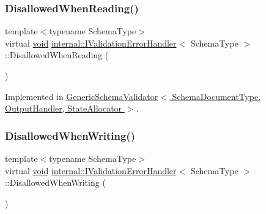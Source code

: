 \mbox{\label{classinternal_1_1IValidationErrorHandler_ac53a7125383d8051f4522ea222c3c5d5}} 
\subsubsection{\texorpdfstring{Disallowed\+When\+Reading()}{DisallowedWhenReading()}}
{\footnotesize\ttfamily template$<$typename Schema\+Type$>$ \\
virtual \hyperlink{imgui__impl__opengl3__loader_8h_ac668e7cffd9e2e9cfee428b9b2f34fa7}{void} \hyperlink{classinternal_1_1IValidationErrorHandler}{internal\+::\+I\+Validation\+Error\+Handler}$<$ Schema\+Type $>$\+::Disallowed\+When\+Reading (\begin{DoxyParamCaption}{ }\end{DoxyParamCaption})\hspace{0.3cm}{\ttfamily [pure virtual]}}



Implemented in \hyperlink{classGenericSchemaValidator_aa8bee0b3cbf45421151cf1b4040c4df7}{Generic\+Schema\+Validator$<$ Schema\+Document\+Type, Output\+Handler, State\+Allocator $>$}.

\mbox{\label{classinternal_1_1IValidationErrorHandler_a1a7e9f0a384be3e0d6ae63d8fe366363}} 
\subsubsection{\texorpdfstring{Disallowed\+When\+Writing()}{DisallowedWhenWriting()}}
{\footnotesize\ttfamily template$<$typename Schema\+Type$>$ \\
virtual \hyperlink{imgui__impl__opengl3__loader_8h_ac668e7cffd9e2e9cfee428b9b2f34fa7}{void} \hyperlink{classinternal_1_1IValidationErrorHandler}{internal\+::\+I\+Validation\+Error\+Handler}$<$ Schema\+Type $>$\+::Disallowed\+When\+Writing (\begin{DoxyParamCaption}{ }\end{DoxyParamCaption})\hspace{0.3cm}{\ttfamily [pure virtual]}}



